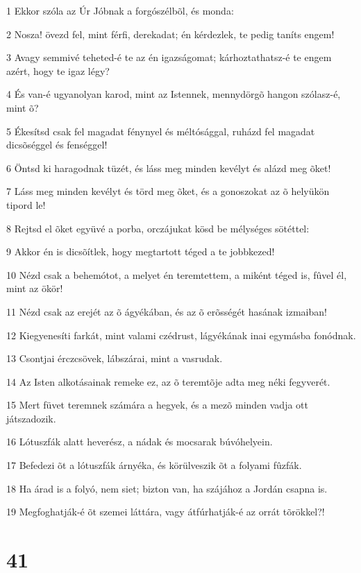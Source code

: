 \par 1 Ekkor szóla az Úr Jóbnak a forgószélbõl, és monda:
\par 2 Nosza! övezd fel, mint férfi, derekadat; én kérdezlek, te pedig taníts engem!
\par 3 Avagy semmivé teheted-é te az én igazságomat; kárhoztathatsz-é te engem azért, hogy te igaz légy?
\par 4 És van-é ugyanolyan karod, mint az Istennek, mennydörgõ hangon szólasz-é, mint õ?
\par 5 Ékesítsd csak fel magadat fénynyel és méltósággal, ruházd fel magadat dicsõséggel és fenséggel!
\par 6 Öntsd ki haragodnak tüzét, és láss meg minden kevélyt és alázd meg õket!
\par 7 Láss meg minden kevélyt és törd meg õket, és a gonoszokat az õ helyükön tipord le!
\par 8 Rejtsd el õket együvé a porba, orczájukat kösd be mélységes sötéttel:
\par 9 Akkor én is dicsõítlek, hogy megtartott téged a te jobbkezed!
\par 10 Nézd csak a behemótot, a melyet én teremtettem, a miként téged is, fûvel él, mint az ökör!
\par 11 Nézd csak az erejét az õ ágyékában, és az õ erõsségét hasának izmaiban!
\par 12 Kiegyenesíti farkát, mint valami czédrust, lágyékának inai egymásba fonódnak.
\par 13 Csontjai érczcsövek, lábszárai, mint a vasrudak.
\par 14 Az Isten alkotásainak remeke ez, az õ teremtõje adta meg néki fegyverét.
\par 15 Mert füvet teremnek számára a hegyek, és a mezõ minden vadja ott játszadozik.
\par 16 Lótuszfák alatt heverész, a nádak és mocsarak búvóhelyein.
\par 17 Befedezi õt a lótuszfák árnyéka, és körülveszik õt a folyami fûzfák.
\par 18 Ha árad is a folyó, nem siet; bizton van, ha szájához a Jordán csapna is.
\par 19 Megfoghatják-é õt szemei láttára, vagy átfúrhatják-é az orrát tõrökkel?!

\chapter{41}


